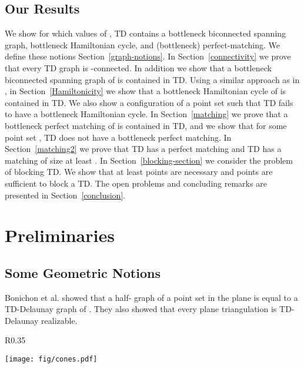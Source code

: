 \documentclass[11pt,a4paper]{article}
\newcommand{\kTD}[2]{\text{-}TD#2}
\begin{document}
\subsection{Our Results}
\label{our-results}
We show for which values of , \kTD{k}{} contains a bottleneck biconnected spanning graph, bottleneck Hamiltonian cycle, and (bottleneck) perfect-matching. We define these notions Section~\ref{graph-notions}. In Section~\ref{connectivity} we prove that every \kTD{k}{} graph is -connected. In addition we show that a bottleneck biconnected spanning graph of  is contained in \kTD{1}{}. Using a similar approach as in \cite{Abellanas2009, Chang1991}, in Section~\ref{Hamiltonicity} we show that a bottleneck Hamiltonian cycle of  is contained in \kTD{7}{}. We also show a configuration of a point set  such that \kTD{5}{} fails to have a bottleneck Hamiltonian cycle. In Section~\ref{matching} we prove that a bottleneck perfect matching of  is contained in \kTD{6}{}, and we show that for some point set , \kTD{5}{} does not have a bottleneck perfect matching. In Section~\ref{matching2} we prove that \kTD{2}{} has a perfect matching and \kTD{1}{} has a matching of size at least . In Section~\ref{blocking-section} we consider the problem of blocking \kTD{k}{}. We show that at least  points are necessary and  points are sufficient to block a \kTD{0}{}. The open problems and concluding remarks are presented in Section~\ref{conclusion}.

\section{Preliminaries}
\label{preliminaries}
\subsection{Some Geometric Notions}
\label{geometric-notions}
Bonichon et al. \cite{Bonichon2010} showed that a half- graph of a point set  in the plane is equal to a TD-Delaunay graph of . They also showed that every plane triangulation is TD-Delaunay realizable. 

\begin{wrapfigure}{R}{0.35\textwidth}
  \begin{center}
\texttt{[image: fig/cones.pdf]}
  \end{center}
  \caption{The construction of the TD-Delaunay graph.}
\label{cones}
\end{wrapfigure}
\end{document}
